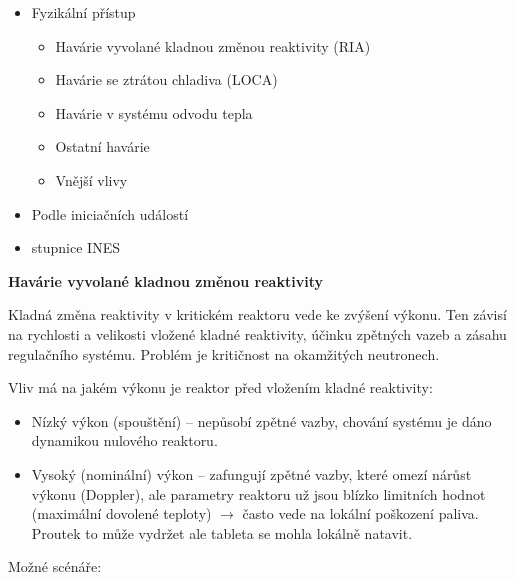 \begin{itemize}
	\item Fyzikální přístup
	
	\begin{itemize}
		\item Havárie vyvolané kladnou změnou reaktivity (RIA)
		\item Havárie se ztrátou chladiva (LOCA)
		\item Havárie v systému odvodu tepla
		\item Ostatní havárie
		\item Vnější vlivy
	\end{itemize}

	\item Podle iniciačních událostí
	\item stupnice INES
\end{itemize}


\textbf{Havárie vyvolané kladnou změnou reaktivity}

Kladná změna reaktivity v kritickém reaktoru vede ke zvýšení výkonu. Ten závisí na rychlosti a velikosti vložené kladné reaktivity, účinku zpětných vazeb a zásahu regulačního systému. Problém je kritičnost na okamžitých neutronech.

Vliv má na jakém výkonu je reaktor před vložením kladné reaktivity:

\begin{itemize}
    \item Nízký výkon (spouštění) -- nepůsobí zpětné vazby, chování systému je dáno dynamikou nulového reaktoru.
    \item Vysoký (nominální) výkon -- zafungují zpětné vazby, které omezí nárůst výkonu (Doppler), ale parametry reaktoru už jsou blízko limitních hodnot (maximální dovolené teploty) $\rightarrow$ často vede na lokální poškození paliva. Proutek to může vydržet ale tableta se mohla lokálně natavit.
\end{itemize}

Možné  scénáře:

